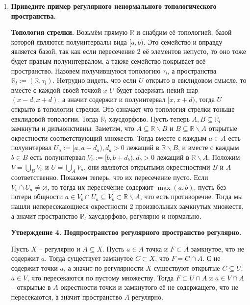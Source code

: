 \documentclass{article}
\begin{document}
\begin{enumerate}
    \item \textbf{Приведите пример регулярного ненормального топологического
        пространства.}\par
        \textbf{Топология стрелки.} Возьмём прямую $\mathbb{R}$ и снабдим её
        топологией, базой которой являются полуинтервалы вида $[a,b)$. Это
        семейство и вправду является базой, так как если пересечение 2 её
        элементов непусто, то оно тоже будет правым полуинтервалом, а также
        семейство покрывает всё пространство. Назовем получившуюся топологию
        $\tau_l$, а пространства $\mathbb{R}_l:=(\mathbb{R},\tau_l)$. Нетрудно
        видеть, что если $U$ открыто в евклидовом смысле, то вместе с каждой
        своей точкой $x$ $U$ будет содержать некий шар $(x-d,x+d)$, а значит
        содержит и полуинтервал $[x,x+d)$, тогда $U$ открыто в топологии
        стрелки. Это означает что топология стрелки тоньше евклидовой топологии.
        Тогда $\mathbb{R}_l$ хаусдорфово. Пусть теперь $A,B\subseteq
        \mathbb{R}_l$ замкнуты
        и дизъюнктивны. Заметим, что $A\subseteq\mathbb{R}\backslash B$ и $B
        \subseteq\mathbb{R}\backslash A$ открытые окрестности соответствующий
        множеств. Тогда вместе с каждым $a\in A$ есть полуинтервал $U_a:=[a,a+
        d_a),d_a>0$ лежащий в $\mathbb{R}\backslash B$, и вместе с каждым $b\in
        B$ есть полуинтервал $V_b:=[b,b+d_b), d_b>0$ лежащий в $\mathbb{R}
        \backslash A$. Положим $V=\bigcup_B V_b$ и $U=\bigcup_A V_a$, они
        являются открытыми окрестностями $B$ и $A$ соответственно. Покажем
        теперь, что их пересечение пусто. Если $V_b\cap U_a\neq\varnothing$,
        то тогда их пересечение содержит $\max(a,b)$, пусть без потери
        общности $a\in V_b\cap U_a\subseteq V_b\subset \mathbb{R}\backslash A$,
        что есть противоречие. Тогда мы нашли непересекающиеся окрестности 2
        произвольных замкнутых множеств, а значит пространство $\mathbb{R}_l$
        хаусдорфово, регулярно и нормально.

        \textbf{Утверждение 4. Подпространство регулярного пространство
        регулярно.}

        Пусть $X$ – регулярно и $A\subseteq X$. Пусть $a\in A$ точка и $F\subset
        A$ замкнутое, что не содержит $a$. Тогда существует замкнутое $C\subset
        X$, что $F=C\cap A$. $С$ не содержит точки  $a$, а значит по
        регулярности $X$ существуют открытые $C\subseteq U$, $a\in V$, что
        пересекаются по пустому множеству. Тогда $F\subset U\cap A$ и $a\in V\cap
        A$ – открытые в $A$ окрестности точки и замкнутого её не содержащего,
        что не пересекаются, а значит пространство $A$ регулярно.


\end{enumerate}
\end{document}
